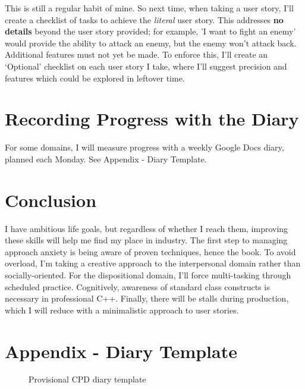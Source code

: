 \documentclass{scrartcl}
\begin{document}
This is still a regular habit of mine. So next time, when taking a user story, I'll create a checklist of tasks to achieve the \textit{literal} user story. This addresses \textbf{no details} beyond the user story provided; for example, 'I want to fight an enemy' would provide the ability to attack an enemy, but the enemy won't attack back. Additional features must not yet be made. To enforce this, I'll create an `Optional' checklist on each user story I take, where I'll suggest precision and features which could be explored in leftover time.

\section{Recording Progress with the Diary} %

For some domains, I will measure progress with a weekly Google Docs diary, planned each Monday. See Appendix - Diary Template.

\section{Conclusion} %

I have ambitious life goals, but regardless of whether I reach them, improving these skills will help me find my place in industry. The first step to managing approach anxiety is being aware of proven techniques, hence the book. To avoid overload, I'm taking a creative approach to the interpersonal domain rather than socially-oriented. For the dispositional domain, I'll force multi-tasking through scheduled practice. Cognitively, awareness of standard class constructs is necessary in professional C++. Finally, there will be stalls during production, which I will reduce with a minimalistic approach to user stories.




\newpage
\section{Appendix - Diary Template}
\begin{figure}[h]
\centering
{}
\caption{Provisional CPD diary template}
\end{figure}
\end{document}
